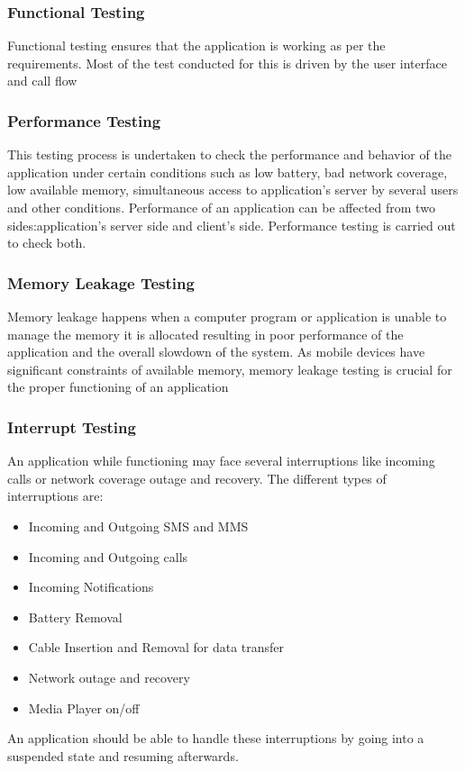 \documentclass[BTech]{srmuthesis}
\begin{document}
\subsubsection{Functional Testing}
Functional testing ensures that the application is working as per the requirements. Most of the test conducted for this is driven by the user interface and call flow
\subsubsection{Performance Testing}
This testing process is undertaken to check the performance and behavior of the application under certain conditions such as low battery, bad network coverage, low available memory, simultaneous access to application’s server by several users and other conditions. Performance of an application can be affected from two sides:application’s server side and client’s side. Performance testing is carried out to check both.
\subsubsection{Memory Leakage Testing}
Memory leakage happens when a computer program or application is unable to manage the memory it is allocated resulting in poor performance of the application and the overall slowdown of the system. As mobile devices have significant constraints of available memory, memory leakage testing is crucial for the proper functioning of an application
\subsubsection{Interrupt Testing}
 An application while functioning may face several interruptions like incoming calls or network coverage outage and recovery. The different types of interruptions are:
\begin{itemize}
\item Incoming and Outgoing SMS and MMS
\item Incoming and Outgoing calls
\item Incoming Notifications
\item Battery Removal
\item Cable Insertion and Removal for data transfer
\item Network outage and recovery
\item Media Player on/off
\end{itemize}
An application should be able to handle these interruptions by going into a suspended state and resuming afterwards.
\end{document}
